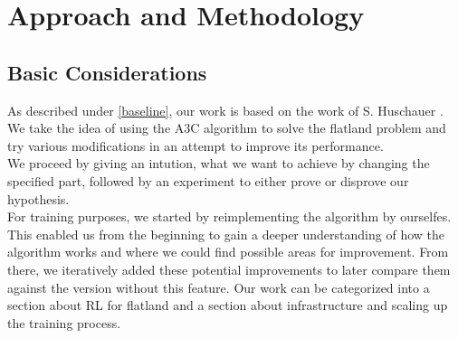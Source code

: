 
%
%

\chapter{Approach and Methodology}\label{chap.vorgehen}
\section{Basic Considerations}\label{basic_cons}
As described under \autoref{baseline}, our work is based on the work of S. Huschauer \cite{flatlandstephan}. We take the idea of using the A3C algorithm to solve the flatland problem and try various modifications in an attempt to improve its performance.\\
We proceed by giving an intution, what we want to achieve by changing the specified part, followed by an experiment to either prove or disprove our hypothesis.\\
For training purposes, we started by reimplementing the algorithm by ourselfes. This enabled us from the beginning to gain a deeper understanding of how the algorithm works and where we could find possible areas for improvement. From there, we iteratively added these potential improvements to later compare them against the version without this feature.
Our work can be categorized into a section about RL for flatland and a section about infrastructure and scaling up the training process.

